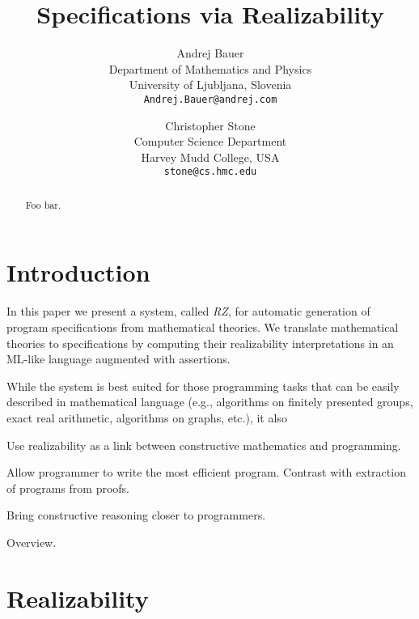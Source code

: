 \documentclass{article}
\begin{document}
\twocolumn

\title{Specifications via Realizability}

\author{
  Andrej Bauer\\
  {\small Department of Mathematics and Physics}\\
  {\small University of Ljubljana, Slovenia}\\
  {\small \texttt{Andrej.Bauer@andrej.com}}
  \and
  Christopher Stone\\
  {\small Computer Science Department}\\
  {\small Harvey Mudd College, USA}\\
  {\small \texttt{stone@cs.hmc.edu}}
}

\maketitle

\begin{abstract}
  Foo bar.
\end{abstract}

\section{Introduction}
\label{sec:introduction}

In this paper we present a system, called \emph{RZ}, for automatic
generation of program specifications from mathematical theories. We
translate mathematical theories to specifications by computing their
realizability interpretations in an ML-like language augmented with
assertions.

While the system is best suited for those programming tasks that can
be easily described in mathematical language (e.g., algorithms on
finitely presented groups, exact real arithmetic, algorithms on
graphs, etc.), it also 



Use realizability as a link between constructive mathematics and
programming.

Allow programmer to write the most efficient program. Contrast with
extraction of programs from proofs.

Bring constructive reasoning closer to programmers.

Overview.

\section{Realizability}
\label{sec:realizability}
\end{document}
